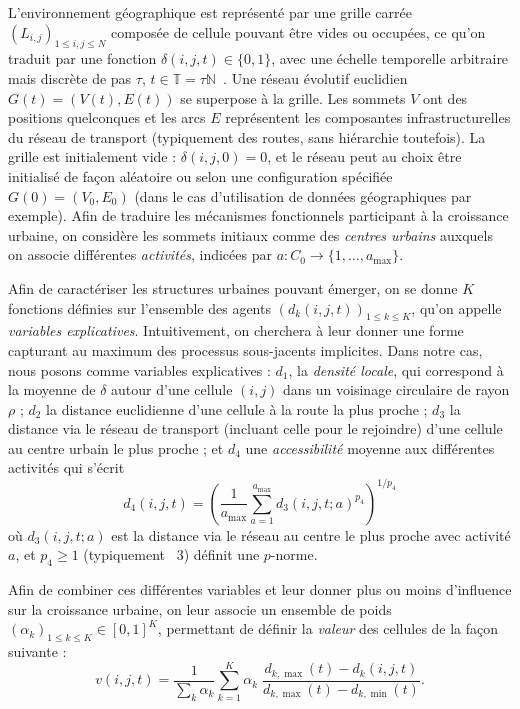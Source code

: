\documentclass[french,12pt]{article}
\begin{document}
L’environnement géographique est représenté par une grille carrée $(L_{i,j})_{1\leq i,j\leq N}$ composée de cellule pouvant être vides ou occupées, ce qu’on traduit par une fonction $\delta(i,j,t)\in\{0,1\}$, avec une échelle temporelle arbitraire mais discrète de pas $\tau$, $t \in \mathbb{T} = \tau \mathbb{N}$~\cite{golden2012modeling}. Une réseau évolutif euclidien $G(t)=(V(t),E(t))$ se superpose à la grille. Les sommets $V$ ont des positions quelconques  et les arcs $E$ représentent les composantes infrastructurelles du réseau de transport (typiquement des routes, sans hiérarchie toutefois). La grille est initialement vide : $\delta(i,j,0)=0$, et le réseau peut au choix être initialisé de façon aléatoire ou selon une configuration spécifiée $G(0)=(V_0,E_0)$ (dans le cas d’utilisation de données géographiques par exemple). Afin de traduire les mécanismes fonctionnels participant à la croissance urbaine, on considère les sommets initiaux comme des \emph{centres urbains}  auxquels on associe différentes \emph{activités}, indicées par $a:C_0\rightarrow\{1,\ldots,a_{\max}\}$.

\bigskip

Afin de caractériser les structures urbaines pouvant émerger, on se donne $K$ fonctions définies sur l’ensemble des agents $(d_k(i,j,t))_{1\leq k\leq K}$, qu’on appelle \emph{variables explicatives}. Intuitivement, on cherchera à leur donner une forme capturant au maximum des processus sous-jacents implicites. Dans notre cas, nous posons comme variables explicatives :  $d_1$, la \emph{densité locale}, qui correspond à la moyenne de $\delta$ autour d’une cellule $(i,j)$ dans un voisinage circulaire de rayon $\rho$ ; $d_2$ la distance euclidienne d’une cellule à la route la plus proche ; $d_3$ la distance via le réseau de transport (incluant celle pour le rejoindre) d’une cellule au centre urbain le plus proche ; et $d_4$ une \emph{accessibilité} moyenne aux différentes activités qui s’écrit
%
\begin{equation}
d_4(i,j,t)=\left(\frac{1}{a_{\max}}\sum_{a=1}^{a_{\max}}d_3(i,j,t;a)^{p_4}\right)^{1/p_4}
\end{equation}
%
où $d_3(i,j,t;a)$ est la distance via le réseau au centre le plus proche avec activité $a$, et $p_4\geq 1$ (typiquement ~3) définit une $p$-norme.

Afin de combiner ces différentes variables et leur donner plus ou moins d’influence sur la croissance urbaine, on leur associe un ensemble de poids $(\alpha_k)_{1\leq k\leq K}\in[0,1]^K$, permettant de définir la \emph{valeur} des cellules de la façon suivante :
%
\begin{equation}
v(i,j,t)=\frac{1}{\sum_k \alpha_k}\sum_{k=1}^K \alpha_k\;\frac{d_{k,\max}(t)-d_k(i,j,t)}{d_{k,\max}(t)-d_{k,\min}(t)}.
\end{equation}
\end{document}
